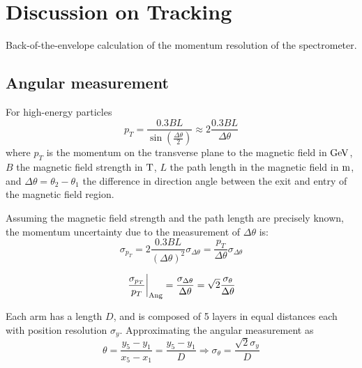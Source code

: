\documentclass[a4paper,11pt,twoside]{article}
\begin{document}
\section{Discussion on Tracking}
Back-of-the-envelope calculation of the momentum resolution of the spectrometer.

\subsection{Angular measurement}

For high-energy particles
\begin{equation}
  p_T =\frac{0.3BL}{\sin\left(\frac{\Delta\theta}{2}\right)}\approx 2\frac{0.3BL}{\Delta\theta}
\end{equation}
where $p_T$ is the momentum on the transverse plane to the magnetic
field in ${\rm GeV}$, $B$ the magnetic field strength in ${\rm T}$,
$L$ the path length in the magnetic field in ${\rm m}$, and
$\Delta\theta=\theta_{2}-\theta_{1}$ the difference in direction angle
between the exit and entry of the magnetic field region.

Assuming the magnetic field strength and the path length are precisely known,
the momentum uncertainty due to the measurement of $\Delta\theta$ is:
\begin{equation}
  \sigma_{p_T} = 2\frac{0.3BL}{\left(\Delta\theta\right)^2}\sigma_{\Delta\theta} =
    \frac{p_T}{\Delta\theta}\sigma_{\Delta\theta}
\end{equation}

\begin{equation}
  \left.\frac{\sigma_{p_T}}{p_T}\right|_{\rm Ang}= \frac{\sigma_{\Delta\theta}}{\Delta\theta} =\sqrt{2}\frac{\sigma_\theta}{\Delta\theta}
\end{equation}

Each arm has a length $D$, and is composed of 5 layers in equal distances each with position resolution $\sigma_y$.
Approximating the angular measurement as
\begin{equation}
  \theta=\frac{y_5-y_1}{x_5-x_1}=\frac{y_5-y_1}{D}\Rightarrow \sigma_\theta=\frac{\sqrt{2}\sigma_y}{D}
\end{equation}
\end{document}
